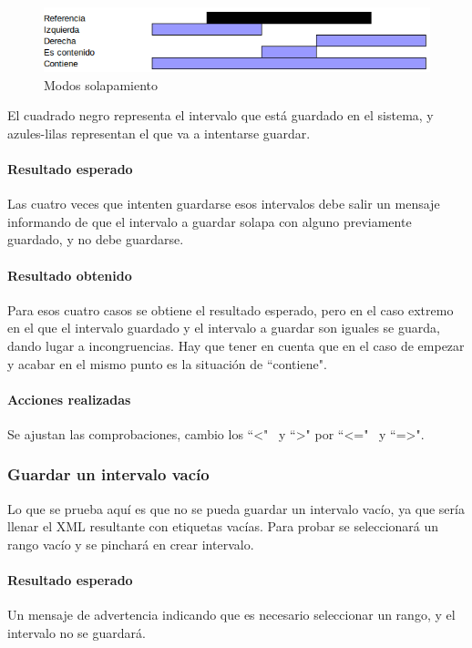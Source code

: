 \begin{figure}[H]
\centering
\includegraphics[width=0.9\linewidth]{./Figures/ModosSolapamiento.png}
\caption{Modos solapamiento}
\label{fig:ModosSolapamiento}
\end{figure}

El cuadrado negro representa el intervalo que est\'a guardado en el sistema, y azules-lilas
representan el que va a intentarse guardar.

\paragraph{Resultado esperado}
Las cuatro veces que intenten guardarse esos intervalos debe salir un mensaje informando
de que el intervalo a guardar solapa con alguno previamente guardado, y no debe
guardarse.

\paragraph{Resultado obtenido}
Para esos cuatro casos se obtiene el resultado esperado, pero en el caso extremo
en el que el intervalo guardado y el intervalo a guardar son iguales se guarda, dando
lugar a incongruencias. Hay que tener en cuenta que en el caso de empezar y acabar
en el mismo punto es la situaci\'on de ``contiene".

\paragraph{Acciones realizadas}
Se ajustan las comprobaciones, cambio los ``<" \ y ``>" por ``<=" \ y ``=>".

\subsubsection{Guardar un intervalo vac\'io}
Lo que se prueba aqu\'i es que no se pueda guardar un intervalo vac\'io, ya que ser\'ia
llenar el XML resultante con etiquetas vac\'ias. Para probar se seleccionar\'a un rango
vac\'io y se pinchar\'a en crear intervalo.

\paragraph{Resultado esperado}
Un mensaje de advertencia indicando que es necesario seleccionar un rango, y
el intervalo no se guardar\'a.

